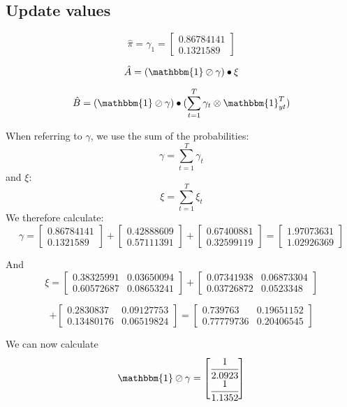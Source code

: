 \subsection{Update values}
\[
\hat{\pi} = \gamma_1 = \begin{bmatrix}
    0.86784141 \\ 0.1321589
\end{bmatrix}
\]

\[
\hat{A} = (\mathbbm{1} \oslash \gamma) \bullet \xi 
\]

\[
\hat{B} = (\mathbbm{1} \oslash \gamma) \bullet (\sum_{t=1}^T \gamma_t \otimes \mathbbm{1}_{yt}^T)
\]

When referring to $\gamma$, we use the sum of the probabilities:
\[
\gamma = \sum_{t=1}^T \gamma_t
\]
and $\xi$:
\[
\xi = \sum_{t=1}^T \xi_t
\]
We therefore calculate:
\[
\gamma = \begin{bmatrix}
    0.86784141 \\ 0.1321589
\end{bmatrix}
+ \begin{bmatrix}
    0.42888609  \\ 0.57111391
\end{bmatrix} + \begin{bmatrix}
    0.67400881 \\ 0.32599119
\end{bmatrix} = \begin{bmatrix}
    1.97073631 \\ 1.02926369
\end{bmatrix}
\]

And
\[
\xi = \begin{bmatrix}
    0.38325991 & 0.03650094 \\
    0.60572687 & 0.08653241
\end{bmatrix} + \begin{bmatrix}
    0.07341938 & 0.06873304 \\
 0.03726872 & 0.0523348  
\end{bmatrix}
\]

\[ + \begin{bmatrix}
    0.2830837  & 0.09127753 \\ 
 0.13480176 & 0.06519824
\end{bmatrix} = \begin{bmatrix}
    0.739763   & 0.19651152 \\
    0.77779736 & 0.20406545
\end{bmatrix}
\]

We can now calculate 
\[
\mathbbm{1} \oslash \gamma = \begin{bmatrix}
    \cfrac{1}{2.0923} \\ \cfrac{1}{1.1352}
\end{bmatrix}
\]

